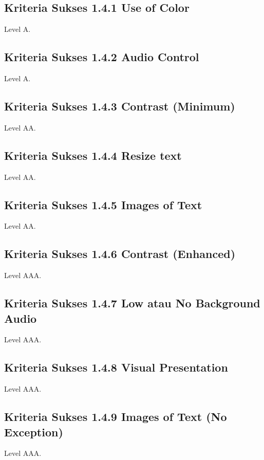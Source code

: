 \subsection{Kriteria Sukses 1.4.1 Use of Color}
\label{sec:kriteria_1.4.1}
Level A.

\subsection{Kriteria Sukses 1.4.2 Audio Control}
\label{sec:kriteria_1.4.2}
Level A.

\subsection{Kriteria Sukses 1.4.3 Contrast (Minimum)}
\label{sec:kriteria_1.4.3}
Level AA.

\subsection{Kriteria Sukses 1.4.4 Resize text}
\label{sec:kriteria_1.4.4}
Level AA.

\subsection{Kriteria Sukses 1.4.5 Images of Text}
\label{sec:kriteria_1.4.5}
Level AA.

\subsection{Kriteria Sukses 1.4.6 Contrast (Enhanced)}
\label{sec:kriteria_1.4.6}
Level AAA.

\subsection{Kriteria Sukses 1.4.7 Low atau No Background Audio}
\label{sec:kriteria_1.4.7}
Level AAA.

\subsection{Kriteria Sukses 1.4.8 Visual Presentation}
\label{sec:kriteria_1.4.8}
Level AAA.

\subsection{Kriteria Sukses 1.4.9 Images of Text (No Exception)}
\label{sec:kriteria_1.4.9}
Level AAA.

